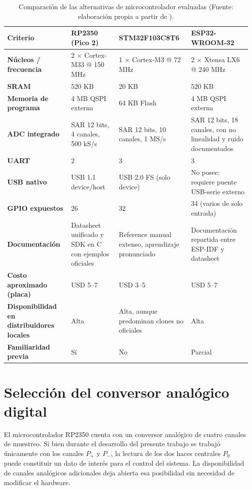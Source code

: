 \begin{table}[h]
\centering
\renewcommand{\arraystretch}{1.3}
\begin{tabularx}{\textwidth}{>{\bfseries}l X X X}
\toprule
Criterio & \textbf{RP2350 (Pico 2)} & \textbf{STM32F103C8T6} & \textbf{ESP32-WROOM-32} \\
\midrule
Núcleos / frecuencia & 2 $\times$ Cortex-M33 @ 150 MHz & 1 $\times$ Cortex-M3 @ 72 MHz & 2 $\times$ Xtensa LX6 @ 240 MHz \\
SRAM & 520 KB & 20 KB & 520 KB \\
Memoria de programa & 4 MB QSPI externa & 64 KB Flash & 4 MB QSPI externa \\
ADC integrado & SAR 12 bits, 4 canales, 500 kS/s & SAR 12 bits, 10 canales, 1 MS/s & SAR 12 bits, 18 canales, con no linealidad y ruido documentados \\
UART & 2 & 3 & 3 \\
USB nativo & USB 1.1 device/host & USB 2.0 FS (solo device) & No posee; requiere puente USB-serie externo \\
GPIO expuestos & 26 & 32 & 34 (varios de solo entrada) \\
Documentación & Datasheet unificado y SDK en C con ejemplos oficiales & Reference manual extenso, aprendizaje pronunciado & Documentación repartida entre ESP-IDF y datasheet \\
Costo aproximado (placa) & USD 5--7 & USD 3--5 & USD 5--7 \\
Disponibilidad en distribuidores locales & Alta & Alta, aunque predominan clones no oficiales & Alta \\
Familiaridad previa & Sí & No & Parcial \\
\bottomrule
\end{tabularx}
\vspace{0.2cm}
\caption{Comparación de las alternativas de microcontrolador evaluadas (Fuente: elaboración propia a partir de \cite{rp2350_datasheet, stm32f103_datasheet, esp32_datasheet}).}
\label{tab:comparacion_micro}
\end{table}

\section{Selección del conversor analógico digital}

El microcontrolador RP2350 cuenta con un conversor analógico de cuatro canales de muestreo. Si bien durante el desarrollo del presente trabajo se trabajó únicamente con los canales $P_+$ y $P_-$, la lectura de los dos haces centrales $P_0$ puede constituir un dato de interés para el control del sistema. La disponibilidad de canales analógicos adicionales deja abierta esa posibilidad sin necesidad de modificar el hardware.

